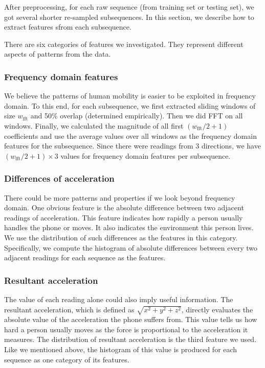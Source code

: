\documentclass{article} %
\begin{document}
After preprocessing, for each raw sequence (from training set or testing set), we got several shorter re-sampled subsequences. In this section, we describe how to extract features sfrom each subsequence.
	
There are six categories of features we investigated. They represent different aspects of patterns from the data.

\subsubsection{Frequency domain features}
We believe the patterns of human mobility is easier to be exploited in frequency domain. To this end, for each subsequence, we first extracted sliding windows of size $w_\mathrm{fft}$ and 50\% overlap (determined empirically). Then we did FFT on all windows. Finally, we calculated the magnitude of all first $(w_\mathrm{fft}/2 + 1)$ coefficients and use the average values over all windows as the frequency domain features for the subsequence. Since there were readings from 3 directions, we have $(w_\mathrm{fft}/2 + 1)\times 3$ values for frequency domain features per subsequence.

\subsubsection{Differences of acceleration}
There could be more patterns and properties if we look beyond frequency domain. One obvious feature is the absolute difference between two adjacent readings of acceleration. This feature indicates how rapidly a person usually handles the phone or moves. It also indicates the environment this person lives. We use the distribution of such differences as the features in this category. Specifically, we compute the histogram of absolute differences between every two adjacent readings for each sequence as the features. 

\subsubsection{Resultant acceleration}
The value of each reading alone could also imply useful information. The resultant acceleration, which is defined as $\sqrt{x^2+y^2+z^2}$, directly evaluates the absolute value of the acceleration the phone suffers from. This value tells us how hard a person usually moves as the force is proportional to the acceleration it measures. The distribution of resultant acceleration is the third feature we used. Like we mentioned above, the histogram of this value is produced for each sequence as one category of its features.
\end{document}
